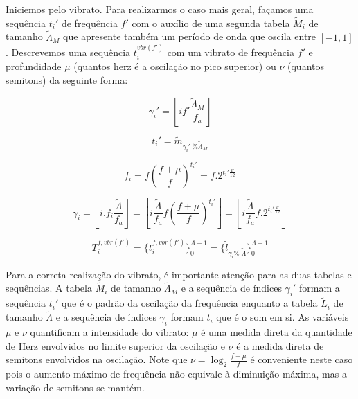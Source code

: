 Iniciemos pelo vibrato. Para realizarmos o caso mais geral, façamos uma sequência $t_i'$
de frequência $f'$ com o auxílio
de uma segunda tabela $\widetilde{M}_i$ de tamanho $\widetilde{\Lambda}_M$ que apresente também
um período de onda que oscila entre $[-1,1]$. Descrevemos uma sequência $t_i^{vbr(f')}$ com
um vibrato de frequência $f'$ e profundidade  $\mu$ (quantos herz é a oscilação no pico superior)
ou $\nu$ (quantos semitons) da seguinte forma:


\begin{equation}\label{vbrGamma}
\gamma_i'=\left \lfloor i f' \frac{\widetilde{\Lambda}_M}{f_a} \right \rfloor
\end{equation}

\begin{equation}\label{vbrAux}
t_i'=\widetilde{m}_{\gamma_i' \;\% \widetilde{\Lambda}_M}
\end{equation}

\begin{equation}\label{vbrF}
f_i=f \left ( \frac{f + \mu }{f} \right )^{t_i'}=f . 2^{t_i'\frac{\nu}{12}}
\end{equation}

\begin{equation}\label{vbrGamma}
\gamma_i = \left \lfloor i . f_i \frac{\widetilde{\Lambda}}{f_a} \right \rfloor = \left \lfloor i \frac{\widetilde{\Lambda}}{f_a}f \left ( \frac{f + \mu }{f} \right )^{t_i'}  \right \rfloor= \left \lfloor i \frac{\widetilde{\Lambda}}{f_a}f . 2^{t_i'\frac{\nu}{12}}  \right \rfloor
\end{equation}

\begin{equation}\label{vbrT}
T_i^{f, vbr(f')}=\{ t_i^{f,vbr(f')} \}_0^{\Lambda-1}=\{ \widetilde{l}_{\gamma_i \%\; \widetilde{\Lambda} } \}_0^{\Lambda-1}
\end{equation}


Para a correta realização do vibrato, é importante atenção para as duas tabelas e sequências.
A tabela $\widetilde{M}_i$ de tamanho $\widetilde{\Lambda}_M$ e a sequência de índices $\gamma_i'$ formam a sequência $t_i'$
 que é o padrão da oscilação da frequência enquanto
a tabela $\widetilde{L}_i$ de tamanho $\widetilde{\Lambda}$ e a sequência de índices $\gamma_i$ formam $t_i$ que é o som em si.
As variáveis $\mu$ e $\nu$ quantificam a intensidade do vibrato: $\mu$ é uma medida direta da quantidade
de Herz envolvidos no limite superior da oscilação e $\nu$ é a medida direta de semitons envolvidos na oscilação.
Note que $\nu=\log_{2}\frac{f+\mu}{f} $ é conveniente neste caso pois o aumento máximo de frequência
não equivale à diminuição máxima, mas a variação de semitons se mantém.

